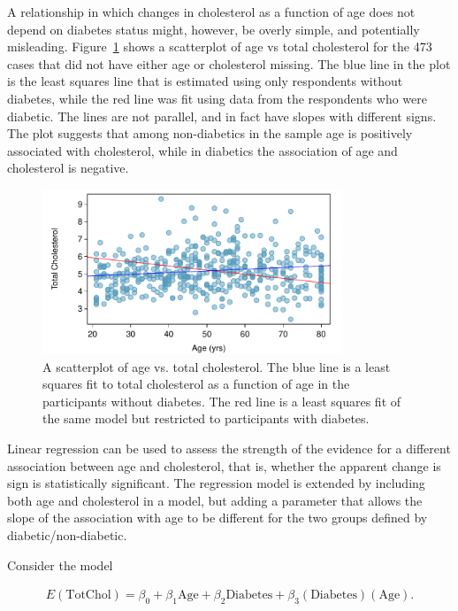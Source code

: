 A relationship in which changes in cholesterol as a function of age does not depend on diabetes status might, however, be overly simple, and potentially misleading. Figure~\ref{nhanesInteractionScatterPlot} shows a scatterplot of age vs total cholesterol for the 473 cases that did not have either age or cholesterol missing.  The blue line in the plot is the least squares line that is estimated using only respondents without diabetes, while the red line was fit using data from the respondents who were diabetic.  The lines are not parallel, and in fact have slopes with different signs.  The plot suggests that among non-diabetics in the sample age is positively associated with cholesterol, while in diabetics the association of age and cholesterol is negative. 

\begin{figure}[h!]
	\centering
	\includegraphics[width=0.8\textwidth]
	{ch_multiple_linear_regression_oi_biostat/figures/nhanesInteractionScatterPlot/nhanesInteractionScatterPlot.pdf}
	\caption{A scatterplot of age vs. total cholesterol.  The blue line is a least squares fit to total cholesterol as a function of age in the participants without diabetes.  The red line is a least squares fit of the same model but restricted to participants with diabetes. }
	\label{nhanesInteractionScatterPlot}
\end{figure}



Linear regression can be used to assess the strength of the evidence for a different association between age and cholesterol, that is,  whether the apparent change is sign is statistically significant.  The regression model is extended by including both age and cholesterol in a model, but adding a parameter that allows the slope of the association with age to be different for the two groups defined by diabetic/non-diabetic. 

Consider the model

\begin{align}\label{nhanesAgeDiabetesInteractionModel}
   E(\text{TotChol}) = \beta_0 + \beta_1\text{Age} + \beta_2\text{Diabetes} + 
       \beta_3 (\text{Diabetes})(\text{Age}). 
\end{align}

